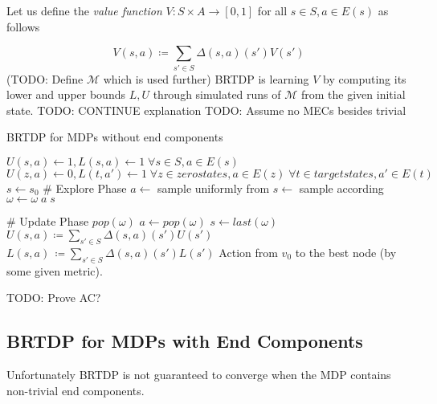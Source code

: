 Let us define the {\em value function} $V : S \times A \to
[0,1]$ for all $s \in S, a \in E(s)$ as follows

\[
    V(s,a) \coloneqq \sum_{s' \in S} \Delta(s,a)(s')V(s')
\]
(TODO: Define $\mathcal{M}$ which is used further)
BRTDP is learning $V$ by computing its lower and upper bounds $L, U$
through simulated runs of $\mathcal{M}$ from the given initial state.
TODO: CONTINUE explanation
TODO: Assume no MECs besides trivial

\begin{algorithm}
\caption{BRTDP for MDPs without end components}
\label{brtdp}
\begin{algorithmic}
\State $U(s,a) \gets 1, L(s,a) \gets 1 \; \forall s \in S, a \in E(s)$
\State $U(z,a) \gets 0, L(t,a') \gets 1
    \; \forall z \in zero states, a \in E(z)
    \; \forall t \in target states, a' \in E(t)$
\State $s \gets s_0$
    \State \# Explore Phase
        \State $a \gets$ sample uniformly from
        \State $s \gets $ sample according
        \State $\omega \gets \omega \; a \; s$
    \EndWhile

    \State \# Update Phase
        \State $pop(\omega)$
        \State $a \gets pop(\omega)$
        \State $s \gets last(\omega)$
        \State $U(s,a) \coloneqq \sum_{s' \in S} \Delta(s,a)(s')U(s')$
        \State $L(s,a)\, \coloneqq \sum_{s' \in S} \Delta(s,a)(s')L(s')$
    \EndWhile
\EndWhile
\State \Return Action from $v_0$ to the best node (by some
given metric).
\end{algorithmic}
\end{algorithm}

TODO: Prove AC?

\subsection*{BRTDP for MDPs with End Components}
Unfortunately BRTDP is not guaranteed to converge when the MDP
contains non-trivial end components.

